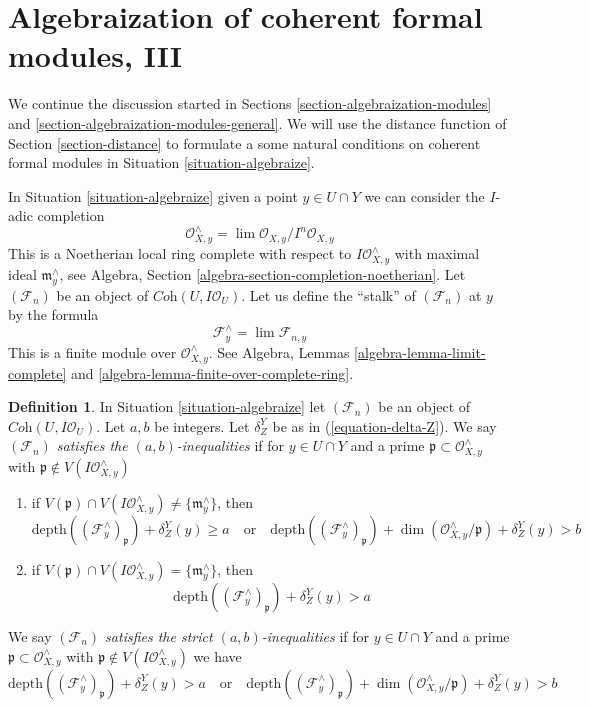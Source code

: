 \documentclass{stacks-project}
\theoremstyle{plain}
\theoremstyle{definition}
\newtheorem{definition}[subsection]{Definition}
\theoremstyle{remark}
\numberwithin{equation}{subsection}
\def\lim{\mathop{\mathrm{lim}}\nolimits}
\begin{document}
\section{Algebraization of coherent formal modules, III}
\label{section-uniqueness}

\noindent
We continue the discussion started in Sections
\ref{section-algebraization-modules} and
\ref{section-algebraization-modules-general}.
We will use the distance function of Section \ref{section-distance}
to formulate a some natural conditions on
coherent formal modules in Situation \ref{situation-algebraize}.

\medskip\noindent
In Situation \ref{situation-algebraize} given a point $y \in U \cap Y$
we can consider the $I$-adic completion
$$
\mathcal{O}_{X, y}^\wedge = \lim \mathcal{O}_{X, y}/I^n\mathcal{O}_{X, y}
$$
This is a Noetherian local ring complete with respect to
$I\mathcal{O}_{X, y}^\wedge$ with maximal ideal $\mathfrak m_y^\wedge$, see
Algebra, Section \ref{algebra-section-completion-noetherian}.
Let $(\mathcal{F}_n)$ be an object of $\textit{Coh}(U, I\mathcal{O}_U)$.
Let us define the ``stalk'' of $(\mathcal{F}_n)$ at $y$ by the formula
$$
\mathcal{F}_y^\wedge = \lim \mathcal{F}_{n, y}
$$
This is a finite module over $\mathcal{O}_{X, y}^\wedge$. See
Algebra, Lemmas \ref{algebra-lemma-limit-complete} and
\ref{algebra-lemma-finite-over-complete-ring}.

\begin{definition}
\label{definition-s-d-inequalities}
In Situation \ref{situation-algebraize} let $(\mathcal{F}_n)$ be an object
of $\textit{Coh}(U, I\mathcal{O}_U)$. Let $a, b$ be integers.
Let $\delta^Y_Z$ be as in (\ref{equation-delta-Z}).
We say
{\it $(\mathcal{F}_n)$ satisfies the $(a, b)$-inequalities} if for
$y \in U \cap Y$ and a prime $\mathfrak p \subset \mathcal{O}_{X, y}^\wedge$
with $\mathfrak p \not \in V(I\mathcal{O}_{X, y}^\wedge)$
\begin{enumerate}
\item if $V(\mathfrak p) \cap V(I\mathcal{O}_{X, y}^\wedge) \not =
\{\mathfrak m_y^\wedge\}$, then
$$
\text{depth}((\mathcal{F}^\wedge_y)_\mathfrak p) + \delta^Y_Z(y) \geq a
\quad\text{or}\quad
\text{depth}((\mathcal{F}^\wedge_y)_\mathfrak p) +
\dim(\mathcal{O}_{X, y}^\wedge/\mathfrak p) + \delta^Y_Z(y) > b
$$
\item if $V(\mathfrak p) \cap V(I\mathcal{O}_{X, y}^\wedge) =
\{\mathfrak m_y^\wedge\}$, then
$$
\text{depth}((\mathcal{F}^\wedge_y)_\mathfrak p) + \delta^Y_Z(y) > a
$$
\end{enumerate}
We say {\it $(\mathcal{F}_n)$ satisfies the strict $(a, b)$-inequalities}
if for $y \in U \cap Y$ and a prime
$\mathfrak p \subset \mathcal{O}_{X, y}^\wedge$ with
$\mathfrak p \not \in V(I\mathcal{O}_{X, y}^\wedge)$
we have
$$
\text{depth}((\mathcal{F}^\wedge_y)_\mathfrak p) + \delta^Y_Z(y) > a
\quad\text{or}\quad
\text{depth}((\mathcal{F}^\wedge_y)_\mathfrak p) +
\dim(\mathcal{O}_{X, y}^\wedge/\mathfrak p) + \delta^Y_Z(y) > b
$$
\end{definition}
\end{document}
